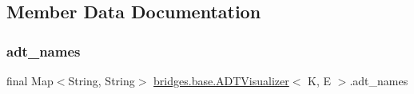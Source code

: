 \subsection{Member Data Documentation}
\hypertarget{classbridges_1_1base_1_1_a_d_t_visualizer_a6646d020143637569d607fa109c71ff9}{}\label{classbridges_1_1base_1_1_a_d_t_visualizer_a6646d020143637569d607fa109c71ff9} 
\subsubsection{\texorpdfstring{adt\+\_\+names}{adt\_names}}
{\footnotesize\ttfamily final Map$<$String, String$>$ \hyperlink{classbridges_1_1base_1_1_a_d_t_visualizer}{bridges.\+base.\+A\+D\+T\+Visualizer}$<$ K, E $>$.adt\+\_\+names}

